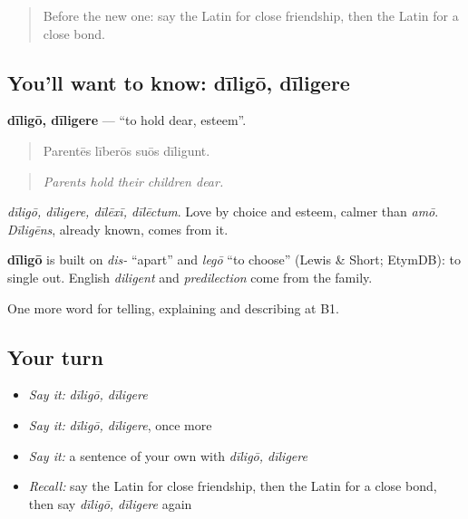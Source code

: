 \begin{quote}
Before the new one: say the Latin for close friendship, then the Latin for a close bond.
\end{quote}

\subsection*{You'll want to know: dīligō, dīligere}
\textbf{dīligō, dīligere} — \textquotedblleft{}to hold dear, esteem\textquotedblright{}.

\begin{quote}
Parentēs līberōs suōs dīligunt.
\end{quote}

\begin{quote}
\emph{Parents hold their children dear.}
\end{quote}

\emph{dīligō, dīligere, dīlēxī, dīlēctum}. Love by choice and esteem, calmer than \emph{amō}. \emph{Dīligēns}, already known, comes from it.

\begin{cousinweb}
\textbf{dīligō} is built on \emph{dis-} \textquotedblleft{}apart\textquotedblright{} and \emph{legō} \textquotedblleft{}to choose\textquotedblright{} (Lewis \& Short; EtymDB): to single out. English \emph{diligent} and \emph{predilection} come from the family.
\end{cousinweb}

\begin{grammarlens}[title={What you've built}]
One more word for telling, explaining and describing at B1.
\end{grammarlens}

\subsection*{Your turn}
\begin{itemize}
\raggedright
  \item \emph{Say it:} \emph{dīligō, dīligere}
  \item \emph{Say it:} \emph{dīligō, dīligere}, once more
  \item \emph{Say it:} a sentence of your own with \emph{dīligō, dīligere}
  \item \emph{Recall:} say the Latin for close friendship, then the Latin for a close bond, then say \emph{dīligō, dīligere} again
\end{itemize}

